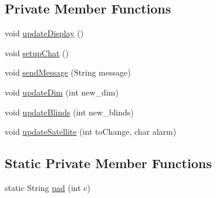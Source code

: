\subsection*{Private Member Functions}
\begin{DoxyCompactItemize}
\item 
void \hyperlink{classcom_1_1example_1_1android_1_1_bluetooth_chat_1_1_l_a_s_a_r_control_ab7eb3c8c2e8604801ee00f11d3af8c3f}{update\-Display} ()
\item 
void \hyperlink{classcom_1_1example_1_1android_1_1_bluetooth_chat_1_1_l_a_s_a_r_control_a5bb861876066eec2e7de8212bc5312b5}{setup\-Chat} ()
\item 
void \hyperlink{classcom_1_1example_1_1android_1_1_bluetooth_chat_1_1_l_a_s_a_r_control_a6a8a2004434afabb628a490d0d5273f9}{send\-Message} (String message)
\item 
void \hyperlink{classcom_1_1example_1_1android_1_1_bluetooth_chat_1_1_l_a_s_a_r_control_ab4704f4dc963fbe366442390a52df041}{update\-Dim} (int new\-\_\-dim)
\item 
void \hyperlink{classcom_1_1example_1_1android_1_1_bluetooth_chat_1_1_l_a_s_a_r_control_a6901587f25cd87fc5b259ac4685dff18}{update\-Blinds} (int new\-\_\-blinds)
\item 
void \hyperlink{classcom_1_1example_1_1android_1_1_bluetooth_chat_1_1_l_a_s_a_r_control_ab084bbab05e4d41e495608164e6bd56c}{update\-Satellite} (int to\-Change, char alarm)
\end{DoxyCompactItemize}
\subsection*{Static Private Member Functions}
\begin{DoxyCompactItemize}
\item 
static String \hyperlink{classcom_1_1example_1_1android_1_1_bluetooth_chat_1_1_l_a_s_a_r_control_ad6e6064f6c7bf4149b827c8882acc43c}{pad} (int c)
\end{DoxyCompactItemize}
